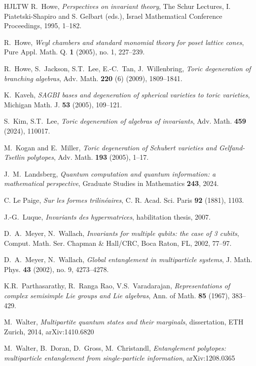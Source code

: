 \documentclass[reqno,11pt]{amsart}
\theoremstyle{remark}
\theoremstyle{definition}
\numberwithin{equation}{section}
\begin{document}
\begin{thebibliography}{HJLTW}
 R.~Howe, \textit{Perspectives on invariant theory}, The Schur Lectures, I. Piatetski-Shapiro and S. Gelbart (eds.), Israel Mathematical Conference Proceedings, 1995, 1--182.

 R.~Howe, {\it Weyl chambers and standard monomial theory for poset lattice cones}, Pure Appl. Math. Q. \textbf{1} (2005), no. 1, 227--239.

 R.~Howe, S.~Jackson, S.T.~Lee, E.-C.~Tan, J.~Willenbring, {\it Toric degeneration of branching algebras}, Adv. Math. \textbf{220} (6) (2009), 1809--1841.

 K.~Kaveh, {\it SAGBI bases and degeneration of spherical varieties to toric varieties}, Michigan Math. J. \textbf{53} (2005), 
109--121.

 S.~Kim, S.T.~Lee,
\textit{Toric degeneration of algebras of invariants}, Adv. Math. \textbf{459} (2024), 110017.

 M.~Kogan and E.~Miller, {\it
	Toric degeneration of Schubert varieties and Gelfand-Tsetlin polytopes}, Adv. Math. \textbf{193} (2005), 1--17.

 J.~M.~Landsberg,  
{\it Quantum computation and quantum information: a mathematical perspective}, Graduate Studies in Mathematics \textbf{243}, 2024.

 C. Le Paige, {\it Sur les formes trilin\'eaires}, C. R. Acad. Sci. Paris \textbf{92} (1881), 1103. 

 J.-G.~Luque, {\it Invariants des hypermatrices}, habilitation thesis, 2007.

 D.~A.~Meyer, N.~Wallach, {\it Invariants for multiple qubits: the case of 3 cubits}, Comput. Math. Ser. Chapman \& Hall/CRC, Boca Raton, FL, 2002, 77--97.

 D.~A.~Meyer, N.~Wallach, {\it Global entanglement in multiparticle systems}, J. Math. Phys. \textbf{43} (2002), no. 9, 4273--4278.

 K.R.~Parthasarathy, R.~Ranga Rao, V.S.~Varadarajan, \emph{Representations of complex semisimple Lie groups and Lie algebras}, Ann. of Math. \textbf{85} (1967), 383--429.

 M.~Walter, \textit{Multipartite quantum states
and their marginals}, dissertation, ETH Zurich, 2014, arXiv:1410.6820

 M.~Walter, B.~Doran,  D.~Gross, M.~Christandl, {\it Entanglement polytopes: multiparticle entanglement from single-particle information}, arXiv:1208.0365

\end{thebibliography}
\end{document}
